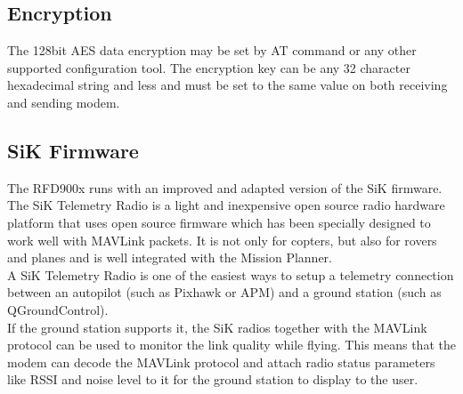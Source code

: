 \subsection{Encryption}
The 128bit AES data encryption may be set by AT command or any other supported configuration tool. The encryption key can be any 32 character hexadecimal string and less and must be set to the same value on both receiving and sending modem. 
%
%
\subsection{SiK Firmware}
The RFD900x runs with an improved and adapted version of the SiK firmware.\\
The SiK Telemetry Radio is a light and inexpensive open source radio hardware platform that uses open source firmware which has been specially designed to work well with MAVLink packets. It is not only for copters, but also for rovers and planes and is well integrated with the Mission Planner.\\
A SiK Telemetry Radio is one of the easiest ways to setup a telemetry connection between an autopilot (such as Pixhawk or APM) and a ground station (such as QGroundControl).\\
If the ground station supports it, the SiK radios together with the MAVLink protocol can be used to monitor the link quality while flying. This means that the modem can decode the MAVLink protocol and attach radio status parameters like RSSI and noise level to it for the ground station to display to the user.
%
%
%
%
%
%
